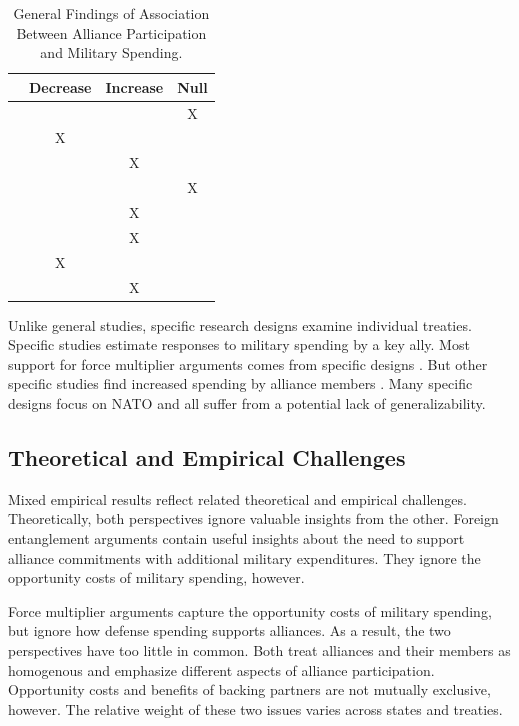 \documentclass[12pt]{article}
\begin{document}
\begin{table}[hbt!]
\begin{center}
\begin{tabular}{lccc}
     & Decrease & Increase & Null \\
\hline
\citet{MostSiverson1987} &  &  & X \\
\citet{Conybeare1994} & X & &  \\
\citet{Diehl1994} &  & X &  \\
\citet{Goldsmith2003} &  &  & X \\
\citet{MorganPalmer2006} &  & X & \\ 
\citet{QuirozFlores2011} &  & X &  \\ 
\citet{DigiuseppePoast2016} & X &  & \\ 
\citet{Horowitzetal2017} &  & X & \\ 
\hline
\end{tabular}
\caption{General Findings of Association Between Alliance Participation and Military Spending.}
\label{tab:results-sum}
\end{center} 
\end{table}


Unlike general studies, specific research designs examine individual treaties. 
Specific studies estimate responses to military spending by a key ally. 
Most support for force multiplier arguments comes from specific designs \citep{BarnettLevy1991, Morrow1993, Sorokin1994, PluemperNeumayer2015}. 
But other specific studies find increased spending by alliance members \citep{ConybeareSandler1990, Chenetal1996}. 
Many specific designs focus on NATO and all suffer from a potential lack of generalizability. 


\subsection{Theoretical and Empirical Challenges}


Mixed empirical results reflect related theoretical and empirical challenges. 
Theoretically, both perspectives ignore valuable insights from the other.  
Foreign entanglement arguments contain useful insights about the need to support alliance commitments with additional military expenditures.
They ignore the opportunity costs of military spending, however. 


Force multiplier arguments capture the opportunity costs of military spending, but ignore how defense spending supports alliances. 
As a result, the two perspectives have too little in common. 
Both treat alliances and their members as homogenous and emphasize different aspects of alliance participation. 
Opportunity costs and benefits of backing partners are not mutually exclusive, however. 
The relative weight of these two issues varies across states and treaties. 
\end{document}
